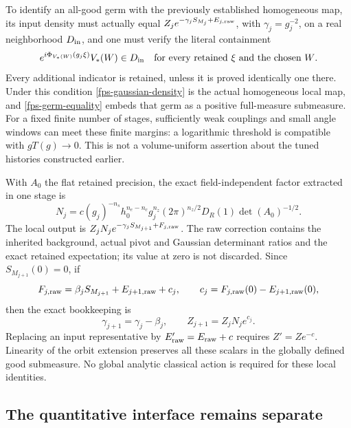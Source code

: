To identify an all-good germ with the previously established
homogeneous map, its input density must actually equal
\(Z_j e^{-\gamma_jS_{M_j}+E_{j,\rm raw}}\), with \(\gamma_j=g_j^{-2}\), on a real neighborhood
\(D_{\rm in}\), and one must verify the literal containment
\begin{equation}
 e^{i\Phi_{V_*(W)}(g_j\xi)}V_*(W)\in D_{\rm in}
 \quad\hbox{for every retained \(\xi\) and the chosen \(W\)}.
 \label{fps-literal-containment}
\end{equation}
Every additional indicator is retained, unless it is proved identically
one there. Under this condition \eqref{fps-gaussian-density} is the
actual homogeneous local map, and \eqref{fps-germ-equality} embeds that
germ as a positive full-measure submeasure. For a fixed finite number
of stages, sufficiently weak couplings and small angle windows can meet
these finite margins: a logarithmic threshold is compatible with
\(gT(g)\to0\). This is not a volume-uniform assertion about the tuned
histories constructed earlier.

With \(A_0\) the flat retained precision, the exact field-independent
factor extracted in one stage is
\begin{equation}
 N_j=c(g_j)^{-n_s}h_0^{n_e-n_c}g_j^{n_z}(2\pi)^{n_z/2}
                       D_R(1)\det(A_0)^{-1/2}.
 \label{fps-vacuum-factor}
\end{equation}
The local output is
\(Z_jN_j e^{-\gamma_jS_{M_{j+1}}+F_{j,\rm raw}}\).
The raw correction contains the inherited background, actual pivot and
Gaussian determinant ratios and the exact retained expectation; its
value at zero is not discarded. Since \(S_{M_{j+1}}(0)=0\), if
\[
 F_{j,\rm raw}=\beta_jS_{M_{j+1}}+E_{j+1,\rm raw}+c_j,
 \qquad c_j=F_{j,\rm raw}(0)-E_{j+1,\rm raw}(0),
\]
then the exact bookkeeping is
\begin{equation}
 \gamma_{j+1}=\gamma_j-\beta_j,\qquad
 Z_{j+1}=Z_jN_j e^{c_j}.
 \label{fps-exact-extraction}
\end{equation}
Replacing an input representative by \(E'_{\rm raw}=E_{\rm raw}+c\)
requires \(Z'=Ze^{-c}\). Linearity of the orbit extension preserves
all these scalars in the globally defined good submeasure. No global
analytic classical action is required for these local identities.

\subsection{The quantitative interface remains separate}
\label{fps-boundary-section}

